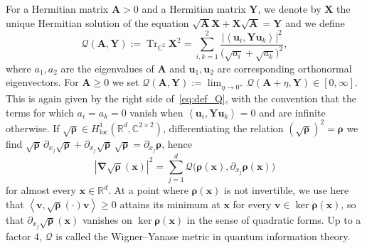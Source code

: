 \documentclass[final,reqno]{amsart}
\theoremstyle{remark}
\renewcommand{\ge}{\geqslant}
\DeclareMathOperator{\Tr}{Tr}
\newcommand{\Trs}{\Tr_{\CC^2}}
\newcommand{\RR}{\mathbb{R}}
\newcommand{\CC}{\mathbb{C}}
\newcommand{\pscal}[1]{\left\langle #1 \right\rangle}
\newcommand{\grad}{\bm{\nabla}}
\newcommand{\QC}{\mathcal{Q}}
\begin{document}
For a Hermitian matrix $\mathbf{A}>0$ and a Hermitian matrix $\mathbf{Y}$, we denote by $\mathbf{X}$ the unique Hermitian solution of the equation $\sqrt{\mathbf{A}}\mathbf{X}+\mathbf{X}\sqrt{\mathbf{A}}=\mathbf{Y}$ and we define
\begin{equation}\label{eq:def_Q}
\QC(\mathbf{A},\mathbf{Y}):=\Trs \mathbf{X}^2=\sum_{i,k=1}^2\frac{|\pscal{\mathbf{u}_i,\mathbf{Y}\mathbf{u}_k}|^2}{\big(\sqrt{a_i}+\sqrt{a_k}\big)^2},
\end{equation}
where $a_1,a_2$ are the eigenvalues of $\mathbf{A}$ and $\mathbf{u}_1,\mathbf{u}_2$ are corresponding orthonormal eigenvectors. For $\mathbf{A}\ge0$ we set $\QC(\mathbf{A},\mathbf{Y}):=\lim_{\eta\to0^+}\QC(\mathbf{A}+\eta,\mathbf{Y})\in[0,\infty]$. This is again given by the right side of~\cref{eq:def_Q}, with the convention that the terms for which $a_i=a_k=0$ vanish when $\pscal{\mathbf{u}_i,\mathbf{Y}\mathbf{u}_k}=0$ and are infinite otherwise. If $\sqrt{\bm{\rho}}\in H^1_{\mathrm{loc}}(\RR^d,\CC^{2\times2})$, differentiating the relation $(\sqrt{\bm{\rho}})^2=\bm{\rho}$ we find $\sqrt{\bm{\rho}}\,\partial_{x_j}\sqrt{\bm{\rho}}+\partial_{x_j}\sqrt{\bm{\rho}}\,\sqrt{\bm{\rho}}=\partial_{x_j}\bm{\rho}$, hence
\begin{equation}\label{eq:gradient_Q}
|\grad\sqrt{\bm{\rho}}(\mathbf{x})|^2=\sum_{j=1}^d\QC\big(\bm{\rho}(\mathbf{x}),\partial_{x_j}\bm{\rho}(\mathbf{x})\big)
\end{equation}
for almost every $\mathbf{x}\in\RR^d$. At a point where $\bm{\rho}(\mathbf{x})$ is not invertible, we use here that $\pscal{\mathbf{v},\sqrt{\bm{\rho}}(\cdot)\mathbf{v}}\ge0$ attains its minimum at $\mathbf{x}$ for every $\mathbf{v}\in\ker \bm{\rho}(\mathbf{x})$, so that $\partial_{x_j}\sqrt{\bm{\rho}}(\mathbf{x})$ vanishes on $\ker \bm{\rho}(\mathbf{x})$ in the sense of quadratic forms. Up to a factor $4$, $\QC$ is called the Wigner--Yanase metric in quantum information theory.
\end{document}
